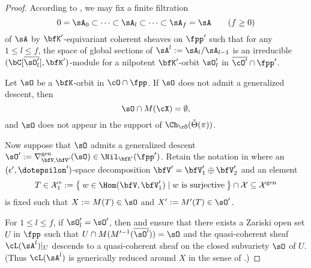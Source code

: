 \documentclass[12pt,a4paper]{amsart}
\newcommand{\CO}{{\mathcal {O}}}
\newcommand{\CX}{{\mathcal {X}}}
\def\gDD{\nabla^{\mathrm{gen}}}
\numberwithin{equation}{section}
\theoremstyle{remark}
\def\slift{\cL}
\def\Thetav{\check{\Theta}}
\def\Thetav{\check{\Theta}}
\def\bcOp{\overline{\cO'}}
\def\bsOp{\overline{\sO'}}
\begin{document}
\begin{proof}

According to %
\cite[Proposition~4.3]{LM}, we may fix a finite filtration
$$0 = \sA_0 \subset \cdots \subset \sA_l \subset \cdots \subset \sA_f=\sA\qquad (f\geq 0)$$
of $\sA$ by $\bfK'$-equivariant coherent sheaves on
$\fpp'$ such that for any $1\leq l\leq f$,
the space of global sections of
$\sA^l := \sA_l/\sA_{l-1}$ is an irreducible $(\bC[\overline{\sO'_l}],\bfK')$-module for a
nilpotent $\bfK'$-orbit $\sO'_l$ in $\bcOp\cap \fpp'$.

Let $\sO$ be a $\bfK$-orbit in $\cO\cap \fpp$. If $\sO$ does not admit a
generalized descent, then $$\sO\cap M(\cX) = \emptyset,$$
and $\sO$ does not appear
in the support of $\Ch_\cO(\Thetav(\pi))$.


Now suppose that $\sO$ admits a generalized descent
$\sO' := \gDD_{\bfV,\bfV'}(\sO)\in \Nil_{\bfK'}(\fpp')$. Retain the notation in
 where an $(\epsilon',\dotepsilon')$-space decomposition
$\bfV' = \bfV'_1\oplus \bfV'_2$ and an element
   \[
     T\in \CX_1^\circ:=\Set{w\in\Hom(\bfV,\bfV'_1)\mid w
     \textrm{ is surjective}}
     \cap \CX\subseteq \CX^{\mathrm{gen}}
\]
 is fixed such that $X := M(T)\in \sO$ and $X':=M'(T)\in \sO'$.



For $1\leq l \leq f$, if  $\sO'_l=\sO'$, then  and  ensure  that
there exists a Zariski open set $U$ in $\fpp$ such that $U \cap
M(M'^{-1}(\bsOp)) = \sO$ and the
quasi-coherent sheaf  $\slift(\sA^l)|_{U}$ descends to a quasi-coherent sheaf on the closed subvariety $\sO$ of $U$. (Thus $\slift(\sA^l)$ is generically reduced around
$X$ in the sense of  \cite[Proposition~2.9]{Vo89}.)




\end{proof}
\end{document}
